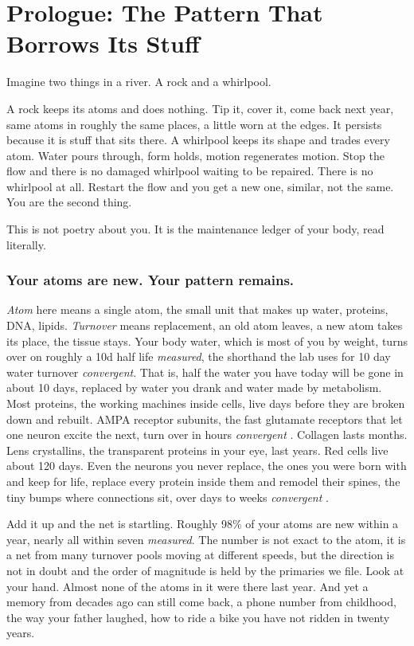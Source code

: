 \chapter{Prologue: The Pattern That Borrows Its Stuff}

Imagine two things in a river. A rock and a whirlpool.

A rock keeps its atoms and does nothing. Tip it, cover it, come back next year, same atoms in roughly the same places, a little worn at the edges. It persists because it is stuff that sits there. A whirlpool keeps its shape and trades every atom. Water pours through, form holds, motion regenerates motion. Stop the flow and there is no damaged whirlpool waiting to be repaired. There is no whirlpool at all. Restart the flow and you get a new one, similar, not the same. You are the second thing.

This is not poetry about you. It is the maintenance ledger of your body, read literally.

\subsection*{Your atoms are new. Your pattern remains.}

\textit{Atom} here means a single atom, the small unit that makes up water, proteins, DNA, lipids. \textit{Turnover} means replacement, an old atom leaves, a new atom takes its place, the tissue stays. Your body water, which is most of you by weight, turns over on roughly a 10d half life \textit{measured}, the shorthand the lab uses for 10 day water turnover \textit{convergent}. That is, half the water you have today will be gone in about 10 days, replaced by water you drank and water made by metabolism. Most proteins, the working machines inside cells, live days before they are broken down and rebuilt. AMPA receptor subunits, the fast glutamate receptors that let one neuron excite the next, turn over in hours \textit{convergent} \citep{kandel2000}. Collagen lasts months. Lens crystallins, the transparent proteins in your eye, last years. Red cells live about 120 days. Even the neurons you never replace, the ones you were born with and keep for life, replace every protein inside them and remodel their spines, the tiny bumps where connections sit, over days to weeks \textit{convergent} \citep{kandel2000}.

Add it up and the net is startling. Roughly 98\% of your atoms are new within a year, nearly all within seven \textit{measured}. The number is not exact to the atom, it is a net from many turnover pools moving at different speeds, but the direction is not in doubt and the order of magnitude is held by the primaries we file. Look at your hand. Almost none of the atoms in it were there last year. And yet a memory from decades ago can still come back, a phone number from childhood, the way your father laughed, how to ride a bike you have not ridden in twenty years.

